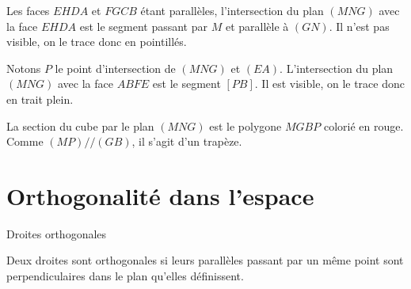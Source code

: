 \documentclass{cornouaille}
\begin{document}
\begin{methode}

  Les faces $EHDA$ et $FGCB$ étant parallèles, l'intersection du plan
  $(MNG)$ avec la face $EHDA$ est le segment passant par $M$ et
  parallèle à $(GN)$. Il n'est pas visible, on le trace donc en
  pointillés.

  Notons $P$ le point d'intersection de $(MNG)$ et
  $(EA)$. L'intersection du plan $(MNG)$ avec la face $ABFE$ est le
  segment $[PB]$. Il est visible, on le trace donc en trait plein.

  La section du cube par le plan $(MNG)$ est le polygone $MGBP$
  colorié en rouge. Comme $(MP)//(GB)$, il s'agit d'un trapèze.
\end{methode}

\section{Orthogonalité dans l'espace}

  Droites orthogonales

\begin{definition}
  Deux droites sont orthogonales si leurs parallèles passant par un
  même point sont perpendiculaires dans le plan qu'elles définissent.
\end{definition}
\end{document}
